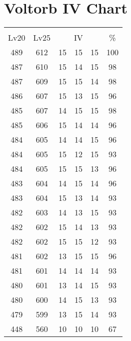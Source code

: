 \documentclass{article}%
\begin{document}
%
\normalsize%
\section{Voltorb IV Chart}%
\label{sec:Voltorb IV Chart}%
\renewcommand{\arraystretch}{1.5}%
\begin{tabular}{|c|c|c|c|c|c|}%
\hline%
\multicolumn{6}{|c|}{\textcolor{white}{ 
\linebreak{Voltorb}
}%
\cellcolor{black}}\\%
\multicolumn{1}{|c}{Lv20}&\multicolumn{1}{c|}{Lv25}&\multicolumn{3}{c|}{IV}&\multicolumn{1}{|c|}{\%}\\%
\hline%
\rowcolor{color100}%
489&612&15&15&15&100\\%
\hline%
\rowcolor{color98}%
487&610&15&14&15&98\\%
\hline%
\rowcolor{color98}%
487&609&15&15&14&98\\%
\hline%
\rowcolor{color96}%
486&607&15&13&15&96\\%
\hline%
\rowcolor{color98}%
485&607&14&15&15&98\\%
\hline%
\rowcolor{color96}%
485&606&15&14&14&96\\%
\hline%
\rowcolor{color96}%
484&605&14&14&15&96\\%
\hline%
\rowcolor{color93}%
484&605&15&12&15&93\\%
\hline%
\rowcolor{color96}%
484&605&15&15&13&96\\%
\hline%
\rowcolor{color96}%
483&604&14&15&14&96\\%
\hline%
\rowcolor{color93}%
483&604&15&13&14&93\\%
\hline%
\rowcolor{color93}%
482&603&14&13&15&93\\%
\hline%
\rowcolor{color93}%
482&602&15&14&13&93\\%
\hline%
\rowcolor{color93}%
482&602&15&15&12&93\\%
\hline%
\rowcolor{color96}%
481&602&13&15&15&96\\%
\hline%
\rowcolor{color93}%
481&601&14&14&14&93\\%
\hline%
\rowcolor{color93}%
480&601&13&14&15&93\\%
\hline%
\rowcolor{color93}%
480&600&14&15&13&93\\%
\hline%
\rowcolor{color93}%
479&599&13&15&14&93\\%
\hline%
\rowcolor{color91}%
448&560&10&10&10&67\\%
\end{tabular}

%
\end{document}
